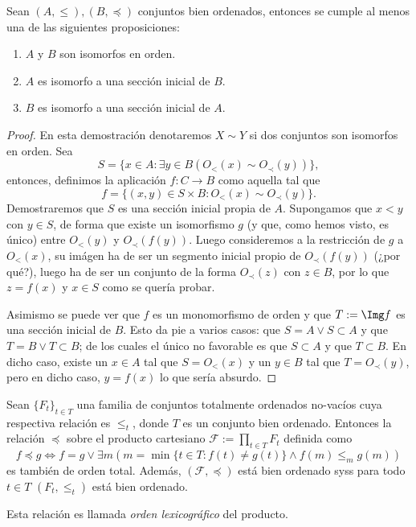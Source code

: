 \documentclass[11pt,a4paper]{book}
\begin{document}
\begin{thm}\label{thm:well-ordered-isomorphisms}
	Sean $(A,\leq),(B,\preceq)$ conjuntos bien ordenados, entonces se cumple al menos una de las siguientes proposiciones:
	\begin{enumerate}
		\item $A$ y $B$ son isomorfos en orden.
		\item $A$ es isomorfo a una sección inicial de $B$.
		\item $B$ es isomorfo a una sección inicial de $A$.
	\end{enumerate}
\end{thm}
\begin{proof}
	En esta demostración denotaremos $X\sim Y$ si dos conjuntos son isomorfos en orden. Sea
	$$S=\{x\in A:\exists y\in B(O_<(x)\sim O_\prec(y))\},$$
	entonces, definimos la aplicación $f:C\rightarrow B$ como aquella tal que
	$$f=\{(x,y)\in S\times B:O_<(x)\sim O_\prec(y)\}.$$
	Demostraremos que $S$ es una sección inicial propia de $A$. Supongamos que $x<y$ con $y\in S$, de forma que existe un isomorfismo $g$ (y que, como hemos visto, es único) entre $O_<(y)$ y $O_\prec(f(y))$. Luego consideremos a la restricción de $g$ a $O_<(x)$, su imágen ha de ser un segmento inicial propio de $O_\prec(f(y))$ (¿por qué?), luego ha de ser un conjunto de la forma $O_\prec(z)$ con $z\in B$, por lo que $z=f(x)$ y $x\in S$ como se quería probar.

	Asimismo se puede ver que $f$ es un monomorfismo de orden y que $T:=\Img f$ es una sección inicial de $B$. Esto da pie a varios casos: que $S=A\vee S\subset A$ y que $T=B\vee T\subset B$; de los cuales el único no favorable es que $S\subset A$ y que $T\subset B$. En dicho caso, existe un $x\in A$ tal que $S=O_<(x)$ y un $y\in B$ tal que $T=O_\prec(y)$, pero en dicho caso, $y=f(x)$ lo que sería absurdo.
\end{proof}
\begin{thm}
	Sean $\{F_t\}_{t\in T}$ una familia de conjuntos totalmente ordenados no-vacíos cuya respectiva relación es $\leq_t$, donde $T$ es un conjunto bien ordenado. Entonces la relación $\preceq$ sobre el producto cartesiano $\mathcal{F}:=\prod_{t\in T}F_t$ definida como
	$$f\preceq g\iff f=g\vee\exists m(m=\min\{t\in T:f(t)\neq g(t)\}\wedge f(m)\leq_m g(m))$$
	es también de orden total. Además, $(\mathcal{F},\preceq)$ está bien ordenado syss para todo $t\in T$ $(F_t,\leq_t)$ está bien ordenado.
\end{thm}
Esta relación es llamada \textit{orden lexicográfico} del producto.
\end{document}
